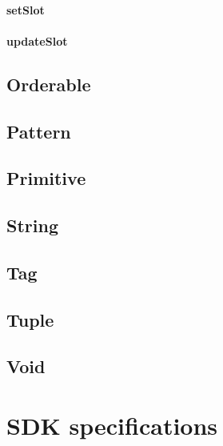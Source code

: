 \documentclass[openright,twoside,12pt]{report}
\begin{document}
\subsubsection{setSlot}
\label{sec:std-object-setslot}

\subsubsection{updateSlot}
\label{sec:std-object-updateslot}

\section{Orderable}
\label{sec:std-orderable}
\section{Pattern}
\section{Primitive}
\section{String}
\section{Tag}
\section{Tuple}
\section{Void}
\label{sec:std-void}

\chapter{\urbi SDK specifications}

\end{document}
